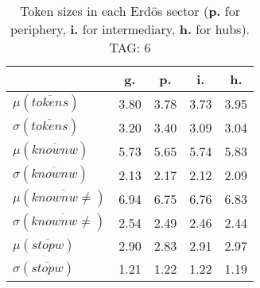\begin{table}[h!]
\begin{center}
\begin{tabular}{| l | c | c | c | c |}\hline
 & g. & p. & i. & h. \\\hline
$\mu(\overline{tokens})$ & 3.80  & 3.78  & 3.73  & 3.95 \\\hline
$\sigma(\overline{tokens})$ & 3.20  & 3.40  & 3.09  & 3.04 \\\hline
$\mu(\overline{knownw})$ & 5.73  & 5.65  & 5.74  & 5.83 \\\hline
$\sigma(\overline{knownw})$ & 2.13  & 2.17  & 2.12  & 2.09 \\\hline
$\mu(\overline{knownw \neq})$ & 6.94  & 6.75  & 6.76  & 6.83 \\\hline
$\sigma(\overline{knownw \neq})$ & 2.54  & 2.49  & 2.46  & 2.44 \\\hline
$\mu(\overline{stopw})$ & 2.90  & 2.83  & 2.91  & 2.97 \\\hline
$\sigma(\overline{stopw})$ & 1.21  & 1.22  & 1.22  & 1.19 \\\hline
\end{tabular}
\caption{Token sizes in each Erd\"os sector ({{\bf p.}} for periphery, {{\bf i.}} for intermediary, {{\bf h.}} for hubs). TAG: 6}
\end{center}
\end{table}